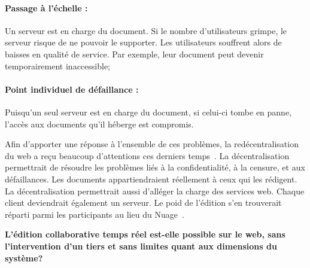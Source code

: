 \paragraph{Passage à l'échelle :} Un serveur est en charge du document. Si le
nombre d'utilisateurs grimpe, le serveur risque de ne pouvoir le supporter. Les
utilisateurs souffrent alors de baisses en qualité de service. Par exemple, leur
document peut devenir temporairement inaccessible;

\paragraph{Point individuel de défaillance :} Puisqu'un seul serveur est en
charge du document, si celui-ci tombe en panne, l'accès aux documents qu'il
héberge est compromis.
  

Afin d'apporter une réponse à l'ensemble de ces problèmes, la redécentralisation
du web a reçu beaucoup d'attentions ces derniers
temps~\cite{mansour2016demonstration, wood2014ethereum}. La décentralisation
permettrait de résoudre les problèmes liés à la confidentialité, à la censure,
et aux défaillances. Les documents appartiendraient réellement à ceux qui les
rédigent. La décentralisation permettrait aussi d'alléger la charge des services
web. Chaque client deviendrait également un serveur. Le poid de l'édition s'en
trouverait réparti parmi les participants au lieu du
Nuage~\cite{mell2011national}.



\textbf{L'édition collaborative temps réel est-elle possible sur le web, sans
  l'intervention d'un tiers et sans limites quant aux dimensions du système?}




